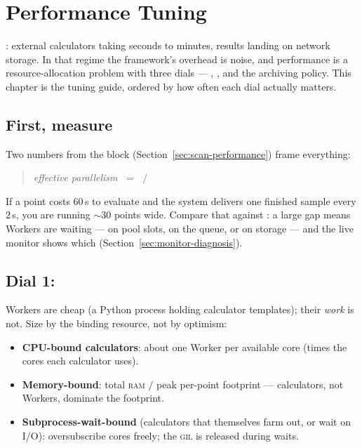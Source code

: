 \chapter{Performance Tuning}
\label{ch:performance}

: external calculators taking
seconds to minutes, results landing on network storage. In that regime the framework's
overhead is noise, and performance is a resource-allocation problem with three dials ---
, , and the archiving policy. This chapter is the tuning
guide, ordered by how often each dial actually matters.

\section{First, measure}
\label{sec:perf-measure}

Two numbers from the  block
(Section~\ref{sec:scan-performance}) frame everything:

\begin{quote}
\emph{effective parallelism} $\;=\;$
 $/$ 
\end{quote}

If a point costs $60$\,s to evaluate and the system delivers one finished sample every
$2$\,s, you are running $\sim$$30$ points wide. Compare that against
: a large gap means Workers are waiting --- on pool slots, on the
queue, or on storage --- and the live monitor shows which
(Section~\ref{sec:monitor-diagnosis}).

\section{Dial 1: }
\label{sec:perf-workers}

Workers are cheap (a Python process holding calculator templates); their \emph{work} is
not. Size by the binding resource, not by optimism:

\begin{itemize}
  \item \textbf{CPU-bound calculators}: about one Worker per available core (times the
        cores each calculator uses).
  \item \textbf{Memory-bound}: total \textsc{ram} $/$ peak per-point footprint ---
        calculators, not Workers, dominate the footprint.
  \item \textbf{Subprocess-wait-bound} (calculators that themselves farm out, or wait
        on I/O): oversubscribe cores freely; the \textsc{gil} is released during waits.
\end{itemize}

